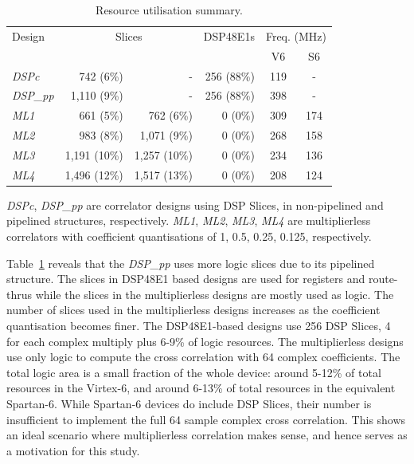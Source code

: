 \begin{table}[h]
	\centering
	\caption{Resource utilisation summary.}
	\label{tab:Imp_Rpt}
	\begin{tabular}{l|r|r|r|c|c}
        \hline \hline
    			Design  & \multicolumn{2}{|c|}{Slices} & DSP48E1s & \multicolumn{2}{|c}{Freq. (MHz)} \\
	\cline{2-6}			         & \makebox[1.2cm][c]{V6} & \makebox[1.2cm][c]{S6}& 	\makebox[1.2cm][c]{V6}	&  V6 & S6    \\
    	\hline
			\emph{DSPc} 	& 742 		(6\%)  & -  			 & 256 (88\%) & 119 & -\\
			\emph{DSP\_pp} &  1,110 	(9\%) & -  			 &  256 (88\%)& 398 & -\\
 			\emph{ML1} 	&  661		(5\%) &	762 (6\%)	 &  0 (0\%)	& 309 & 174\\
			\emph{ML2} 	&  983 	(8\%) &	1,071 (9\%) &  0 (0\%)	& 268 & 158\\
			\emph{ML3} 	&  1,191 	(10\%) &	1,257 (10\%) &  0 (0\%)	& 234 & 136\\
			\emph{ML4} 	&  1,496 	(12\%) &	1,517 (13\%) &  0 (0\%)	& 208 & 124\\

    	\hline \hline
    \end{tabular}
\end{table}

\emph{DSPc}, \emph{DSP\_pp} are correlator designs using DSP Slices, in non-pipelined and pipelined structures, respectively.
\emph{ML1}, \emph{ML2}, \emph{ML3}, \emph{ML4} are multiplierless correlators with coefficient quantisations of 1, 0.5, 0.25, 0.125, respectively.

Table~\ref{tab:Imp_Rpt} reveals that the \emph{DSP\_pp} uses more logic slices due to its pipelined structure.
The slices in DSP48E1 based designs are used for registers and route-thrus while the slices in the multiplierless designs are mostly used as logic.
The number of slices used in the multiplierless designs increases as the coefficient quantisation becomes finer.
The DSP48E1-based designs use 256 DSP Slices, 4 for each complex multiply plus 6-9\% of logic resources.
The multiplierless designs use only logic to compute the cross correlation with 64 complex coefficients.
The total logic area is a small fraction of the whole device: around 5-12\% of total resources in the Virtex-6, and around 6-13\% of total resources in the equivalent Spartan-6.
While Spartan-6 devices do include DSP Slices, their number is insufficient to implement the full 64 sample complex cross correlation.
This shows an ideal scenario where multiplierless correlation makes sense, and hence serves as a motivation for this study.

